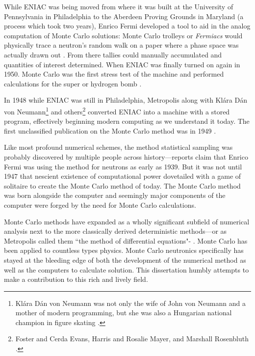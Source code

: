 While ENIAC was being moved from where it was built at the University of Pennsylvania in Philadelphia to the Aberdeen Proving Grounds in Maryland (a process which took two years), Enrico Fermi developed a tool to aid in the analog computation of Monte Carlo solutions:
Monte Carlo trolleys or \textit{Fermiacs} would physically trace a neutron's random walk on a paper where a phase space was actually drawn out \cite{metropolis_1987_history}.
From there tallies could manually accumulated and quantities of interest determined.
When ENIAC was finally turned on again in 1950. Monte Carlo was the first stress test of the machine and performed calculations for the super or hydrogen bomb \cite{metropolis_1987_history}.

In 1948 while ENIAC was still in Philadelphia, Metropolis along with Klára Dán von Neumann\footnote{
Klára Dán von Neumann was not only the wife of John von Neumann and a mother of modern programming, but she was also a Hungarian national champion in figure skating \cite{dyson_2012_digital}.}
and others\footnote{Foster and Cerda Evans, Harris and Rosalie Mayer, and Marshall Rosenbluth \cite{switman_2017_unheralded}.} converted ENIAC into a machine with a stored program, effectively beginning modern computing as we understand it today.
The first unclassified publication on the Monte Carlo method was in 1949 \cite{metropolis_1949_monteCarlo}.

Like most profound numerical schemes, the method statistical sampling was probably discovered by multiple people across history---reports claim that Enrico Fermi was using the method for neutrons as early as 1939.
But it was not until 1947 that nescient existence of computational power dovetailed with a game of solitaire to create the Monte Carlo method of today.
The Monte Carlo method was born alongside the computer and seemingly major components of the computer were forged by the need for Monte Carlo calculations.

Monte Carlo methods have expanded as a wholly significant subfield of numerical analysis next to the more classically derived deterministic methods---or as Metropolis called them ``the method of differential equations"- \cite{anderson_1986_maniac}.
Monte Carlo has been applied to countless types physics.
Monte Carlo neutronics specifically has stayed at the bleeding edge of both the development of the numerical method as well as the computers to calculate solution.
This dissertation humbly attempts to make a contribution to this rich and lively field.


